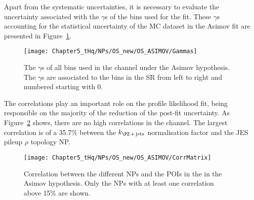 Apart from the systematic uncertainties, it is necessary to evaluate the uncertainty associated with the
$\gamma$s of the bins used for the fit. These $\gamma$s accounting for the statistical uncertainty of the MC dataset in the
\dilepOStau Asimov fit are presented in Figure~\ref{fig:ChaptH:Asimov:OS:Gammas}.


\begin{figure}[h]
\centering
 \texttt{[image: Chapter5\_tHq/NPs/OS\_new/OS\_ASIMOV/Gammas]}
\caption{The $\gamma$s of all bins used in the \dilepOStau channel under the Asimov hypothesis.
The $\gamma$s are associated to the bins in the SR from left to right
and numbered starting with 0.} 
\label{fig:ChaptH:Asimov:OS:Gammas}
\end{figure}

The correlations play an important role on the profile likelihood fit, being
responsible on the majority of the reduction of the post-fit uncertainty. 
As Figure~\ref{fig:ChaptH:Asimov:OS:Correlation} shows, there are 
no high correlations in the \dilepOStau channel. The largest correlation
is of a 35.7\% between the $k_{\Zjets}$ normalisation factor and the 
JES pileup $\rho$ topology NP. 



\begin{figure}[h]
\centering
 \texttt{[image: Chapter5\_tHq/NPs/OS\_new/OS\_ASIMOV/CorrMatrix]}
\caption{Correlation between the different NPs and the POIs in the \dilepOStau in the Asimov hypothesis. 
Only the NPs with at least one correlation above 15\% are shown.} 
\label{fig:ChaptH:Asimov:OS:Correlation}
\end{figure}

